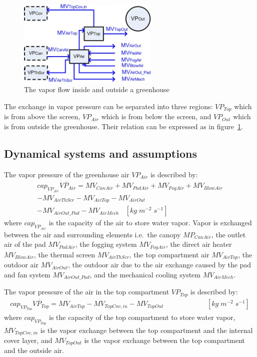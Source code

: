 \documentclass[a4paper]{article}
\begin{document}
\begin{figure}[H]
  \centering
  \includegraphics[width=0.6\textwidth]{VP}
  \caption{The vapor flow inside and outside a greenhouse}\label{fig:VP}
\end{figure}

The exchange in vapor pressure can be separated into three regions: \(VP_{Top}\) which is from above the screen, \(VP_{Air}\) which is from below the screen, and \(VP_{Out}\) which is from outside the greenhouse.
Their relation can be expressed as in figure~\ref{fig:VP}.

\subsection{Dynamical systems and assumptions}
The vapor pressure of the greenhouse air \(VP_{Air}\) is described by:
\begin{multline*}
  cap_{VP_{Air}}\dot{VP_{Air}} = MV_{CanAir} + MV_{PadAir} + MV_{FogAir} + MV_{BlowAir} \\
  - MV_{AirThScr} - MV_{AirTop} - MV_{AirOut} \\
  - MV_{AirOut\_Pad} - MV_{AirMech} ~~~~ [kg\;m^{-2}\;s^{-1}]
\end{multline*}
where \(cap_{VP_{Air}}\) is the capacity of the air to store water vapor.
Vapor is exchanged between the air and surrounding elements i.e.\ the canopy \(MP_{CanAir}\), the outlet air of the pad \(MV_{PadAir}\), the fogging system \(MV_{FogAir}\), the direct air heater \(MV_{BlowAir}\), the thermal screen \(MV_{AirThScr}\), the top compartment air \(MV_{AirTop}\), the outdoor air \(MV_{AirOut}\), the outdoor air due to the air exchange caused by the pad and fan system \(MV_{AirOut\_Pad}\), and the mechanical cooling system \(MV_{AirMech}\).

The vapor pressure of the air in the top compartment \(VP_{Top}\) is described by:
\begin{multline*}
  cap_{VP_{Top}}\dot{VP_{Top}} = MV_{AirTop} - MV_{TopCov,in} - MV_{TopOut} ~~~~~~~~~~~~~~~~~~~~~~~~~~~~ [kg\;m^{-2}\;s^{-1}]
\end{multline*}
where \(cap_{VP_{Top}}\) is the capacity of the top compartment to store water vapor, \(MV_{TopCov,in}\) is the vapor exchange between the top compartment and the internal cover layer, and \(MV_{TopOut}\) is the vapor exchange between the top compartment and the outside air.
\end{document}
